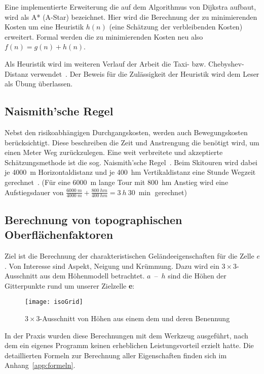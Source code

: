 Eine implementierte Erweiterung die auf dem Algorithmus von Dijkstra aufbaut, wird als A* (A-Star) bezeichnet. Hier wird die Berechnung der zu minimierenden Kosten um eine Heuristik $h(n)$ (eine Schätzung der verbleibenden Kosten) erweitert. Formal werden die zu minimierenden Kosten neu also $f(n)=g(n)+h(n)$.~\cite{Hart1968}

Als Heuristik wird im weiteren Verlauf der Arbeit die Taxi- bzw. Chebyshev-Distanz verwendet~\cite{cantrell2000modern}. Der Beweis für die Zulässigkeit der Heuristik wird dem Leser als Übung überlassen. 

\subsection{Naismith'sche Regel}

Nebst den risikoabhängigen Durchgangskosten, werden auch Bewegungskosten berücksichtigt. Diese beschreiben die Zeit und Anstrengung die benötigt wird, um einen Meter Weg zurückzulegen. Eine weit verbreitete und akzeptierte Schätzungsmethode ist die sog. Naismith'sche Regel~\cite{naismithsrule}.
Beim Skitouren wird dabei je \qty{4000}{m} Horizontaldistanz und je \qty{400}{hm} Vertikaldistanz eine Stunde Wegzeit gerechnet~\cite{sacbergspwinter}\cite{naismithsrule}. (Für eine \qty{6000}{m} lange Tour mit \qty{800}{hm} Anstieg wird eine Aufstiegsdauer von $\frac{\qty{6000}{m}}{\qty{4000}{m}} + \frac{\qty{800}{hm}}{\qty{400}{hm}} = \qty{3}{h}\ \qty{30}{\min}$ gerechnet)

\subsection{Berechnung von topographischen Oberflächenfaktoren}
Ziel ist die Berechnung der charakteristischen Geländeeigenschaften für die Zelle $e$.
Von Interesse sind Aspekt, Neigung und Krümmung.
Dazu wird ein $3 \times 3$-Ausschnitt aus dem Höhenmodell betrachtet. 
$a$~--~$h$ sind die Höhen der Gitterpunkte rund um unserer Zielzelle \textbf{e}:

\begin{figure}[H]
  \centering
  \texttt{[image: isoGrid]}
  \caption{$3 \times 3$-Ausschnitt von Höhen aus einem \acrshort{dem} und deren Benennung}
\end{figure}

In der Praxis wurden diese Berechnungen mit dem Werkzeug  ausgeführt, nach dem ein eigenes Programm keinen erheblichen Leistungsvorteil erzielt hatte. Die detaillierten Formeln zur Berechnung aller Eigenschaften finden sich im Anhang~\ref{app:formeln}.


